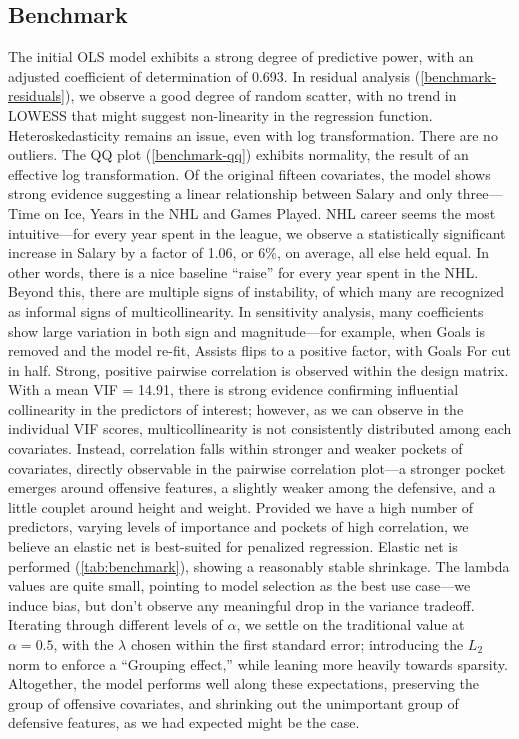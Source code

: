 \documentclass[10pt]{article}
\begin{document}
\subsection{Benchmark}
The initial OLS model %
exhibits a strong degree of predictive power, with an adjusted coefficient of determination of 0.693. In residual analysis (\autoref{benchmark-residuals}), we observe a good degree of random scatter, with no trend in LOWESS that might suggest non-linearity in the regression function. Heteroskedasticity remains an issue, even with log transformation. There are no outliers. The QQ plot (\autoref{benchmark-qq}) exhibits normality, the result of an effective log transformation. Of the original fifteen covariates, the model shows strong evidence suggesting a linear relationship between Salary and only three—Time on Ice, Years in the NHL and Games Played. NHL career seems the most intuitive—for every year spent in the league, we observe a statistically significant increase in Salary by a factor of 1.06, or 6\%, on average, all else held equal. 
 In other words, there is a nice baseline “raise” for every year spent in the NHL. Beyond this, there are multiple signs of instability, of which many are recognized as informal signs of multicollinearity. In sensitivity analysis, many coefficients show large variation in both sign and magnitude—for example, when Goals is removed and the model re-fit, Assists flips to a positive factor, with Goals For cut in half. Strong, positive pairwise correlation is observed within the design matrix.
With a mean VIF = 14.91, there is strong evidence confirming influential collinearity in the predictors of interest; however, as we can observe in the individual VIF scores, multicollinearity is not consistently distributed among each covariates. Instead, correlation falls within stronger and weaker pockets of covariates, directly observable in the pairwise correlation plot—a stronger pocket emerges around offensive features, a slightly weaker among the defensive, and a little couplet around height and weight. Provided we have a high number of predictors, varying levels of importance and pockets of high correlation, we believe an elastic net is best-suited for penalized regression.
Elastic net is performed (\autoref{tab:benchmark}), showing a reasonably stable shrinkage. The lambda values are quite small, pointing to model selection as the best use case—we induce bias, but don’t observe any meaningful drop in the variance tradeoff. Iterating through different levels of $\alpha$, we settle on the traditional value at $\alpha = 0.5$, with the $\lambda$ chosen within the first standard error; introducing the $L_2$ norm to enforce a “Grouping effect,” while leaning more heavily towards sparsity. Altogether, the model performs well along these expectations, preserving the group of offensive covariates, and shrinking out the unimportant group of defensive features, as we had expected might be the case. 
\end{document}
